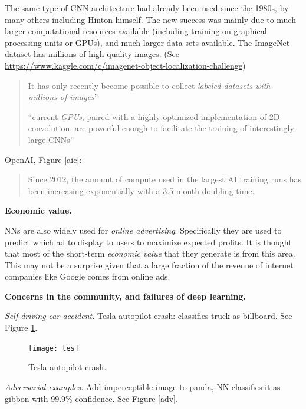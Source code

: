 \documentclass[english]{article}
\begin{document}
The same type of CNN architecture had already been used since the 1980s, by many others including Hinton himself. The new success was mainly due to much larger  computational  resources available (including training on graphical processing units or GPUs), and much larger data sets available. The ImageNet dataset has millions of high quality  images. (See \url{https://www.kaggle.com/c/imagenet-object-localization-challenge})

\begin{quote}

It has only recently become possible to collect
\emph{labeled datasets with millions of images}''

``current \emph{GPUs}, paired with a highly-optimized implementation of 2D convolution, are powerful
enough to facilitate the training of interestingly-large CNNs''
\end{quote}

OpenAI, Figure \ref{aic}: 
\begin{quote}
Since 2012, the amount of compute used in the largest AI training runs has been increasing exponentially with a 3.5 month-doubling time.
\end{quote}

\item {\bf Economic value.}

NNs are also widely used for  \emph{online advertising}.  Specifically they are used to  predict  which ad to display to users to maximize  expected profits. It is thought that  most of the short-term \emph{economic value} that they generate  is from this area. This may not be a surprise given  that a large fraction of the revenue of internet companies like Google comes from online ads. 



\item {\bf Concerns in the community, and failures of deep learning.}

\benum 
\item
\emph{Self-driving car accident.}  Tesla autopilot crash: classifies truck as billboard. See Figure \ref{tes}.

\begin{figure}
  \centering
  \texttt{[image: tes]}
  \caption{Tesla autopilot crash.}
  \label{tes}
\end{figure}
\item

\emph{Adversarial examples.} Add imperceptible image to panda, NN classifies it as gibbon with 99.9\% confidence. See Figure \ref{adv}.
\end{document}
